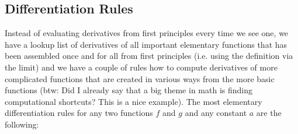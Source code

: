 %
%




\subsection{Differentiation Rules}
Instead of evaluating derivatives from first principles every time we see one, we have a lookup list of derivatives of all important elementary functions that has been assembled once and for all from first principles (i.e. using the definition via the limit) and we have a couple of rules how to compute derivatives of more complicated functions that are created in various ways from the more basic functions (btw: Did I already say that a big theme in math is finding computational shortcuts? This is a nice example). The most elementary differentiation rules for any two functions $f$ and $g$ and any constant $a$ are the following:

